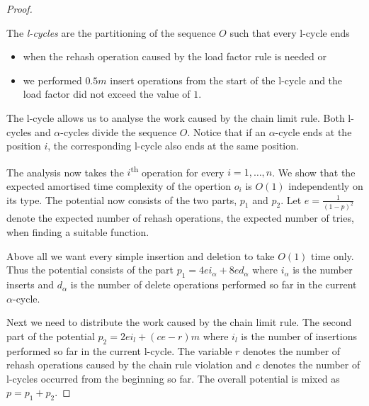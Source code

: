 \begin{proof}
\begin{definition}[l-cycle]
The \emph{l-cycles} are the partitioning of the sequence $O$ such that every l-cycle ends
\begin{itemize}
\item when the rehash operation caused by the load factor rule is needed or
\item we performed $0.5 m$ insert operations from the start of the l-cycle and the load factor did not exceed the value of $1$.
\end{itemize}
\end{definition}
The l-cycle allows us to analyse the work caused by the chain limit rule. Both l-cycles and $\alpha$-cycles divide the sequence $O$. Notice that if an $\alpha$-cycle ends at the position $i$, the corresponding l-cycle also ends at the same position. 

The analysis now takes the $i$\textsuperscript{th} operation for every $i = 1, \dots, n$. We show that the expected amortised time complexity of the opertion $o_i$ is $O(1)$ independently on its type. The potential now consists of the two parts, $p_1$ and $p_2$. Let $e = \frac{1}{(1 - p) ^ 2}$ denote the expected number of rehash operations, the expected number of tries, when finding a suitable function. 

Above all we want every simple insertion and deletion to take $O(1)$ time only. Thus the potential consists of the part $p_1 = 4ei_{\alpha} + 8ed_{\alpha}$ where $i_{\alpha}$ is the number inserts and $d_{\alpha}$ is the number of delete operations performed so far in the current $\alpha$-cycle. 

Next we need to distribute the work caused by the chain limit rule. The second part of the potential $p_2 = 2ei_{l} + (ce - r) m$ where $i_l$ is the number of insertions performed so far in the current l-cycle. The variable $r$ denotes the number of rehash operations caused by the chain rule violation and $c$ denotes the number of l-cycles occurred from the beginning so far. The overall potential is mixed as $p = p_1 + p_2$.


\end{proof}
